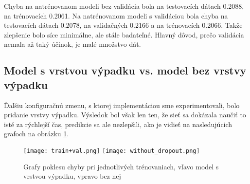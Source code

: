 Chyba na natrénovanom modeli bez validácia bola na testovacích dátach 0.2088, na trénovacích 0.2061. Na natrénovanom modeli s validáciou bola chyba na testovacích dátach 0.2078, na validačných 0.2166 a na trénovacích 0.2066. Takže zlepšenie bolo síce minimálne, ale stále badateľné. Hlavný dôvod, prečo validácia nemala až taký účinok, je malé množstvo dát. 

\subsection{Model s vrstvou výpadku vs. model bez vrstvy výpadku}
\label{model_graph}
\label{dropout_vs_nodropout}
Ďalšiu konfiguračnú zmenu, s ktorej implementáciou sme experimentovali, bolo pridanie vrstvy výpadku. Výsledok bol však len ten, že sieť sa dokázala naučiť to isté za rýchlejší čas, predikcie sa ale nezlepšili, ako je vidieť na nasledujúcich grafoch na obrázku \ref{dropout}. 

	\begin{figure}[H]
		
		\texttt{[image: train+val.png]}
		\texttt{[image: without\_dropout.png]}
		\caption[Model s vrstvou výpadku vs. bez nej]{Grafy poklesu chyby pri jednotlivých trénovaniach, vľavo model s vrstvou výpadku, vpravo bez nej}\label{dropout}
	\end{figure}
	
